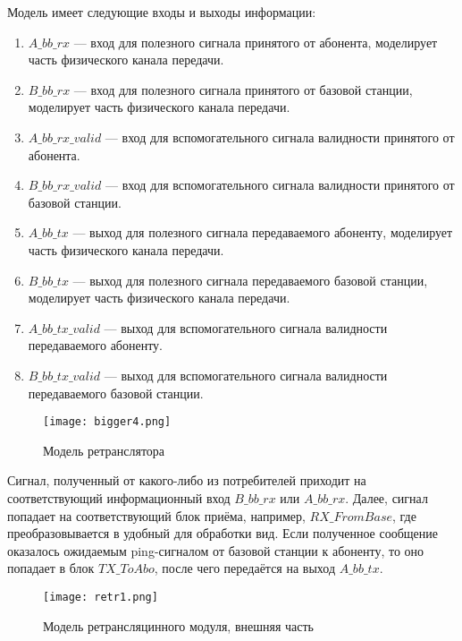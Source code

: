  Модель имеет следующие входы и выходы информации: 
    \begin{enumerate} 	
		\item $A\_bb\_rx$ — вход для полезного сигнала принятого от абонента, моделирует часть физического канала передачи.

            \item $B\_bb\_rx$ — вход для полезного сигнала принятого от базовой станции, моделирует часть физического канала передачи.
  
            \item $A\_bb\_rx\_valid$ — вход для вспомогательного сигнала валидности принятого от абонента.

            \item $B\_bb\_rx\_valid$ — вход для вспомогательного сигнала валидности принятого от базовой станции.

            \item $A\_bb\_tx$ — выход для полезного сигнала передаваемого абоненту, моделирует часть физического канала передачи.

             \item $B\_bb\_tx$ — выход для полезного сигнала передаваемого базовой станции, моделирует часть физического канала передачи.
  
            \item $A\_bb\_tx\_valid$ — выход для вспомогательного сигнала валидности передаваемого абоненту.

             \item $B\_bb\_tx\_valid$ — выход для вспомогательного сигнала валидности передаваемого базовой станции.
\end{enumerate}

\begin{figure}[h!]
	\centering
	\texttt{[image: bigger4.png]}
	\caption{Модель ретранслятора}
	\label{fig:model14}
\end{figure}

Сигнал, полученный от какого-либо из потребителей приходит на соответствующий информационный вход $B\_bb\_rx$ или $A\_bb\_rx$. Далее, сигнал попадает на соответствующий блок приёма, например, $RX\_FromBase$, где преобразовывается в удобный для обработки вид. Если полученное сообщение оказалось ожидаемым ping-сигналом от базовой станции к абоненту, то оно попадает в блок $TX\_ToAbo$, после чего передаётся на выход $A\_bb\_tx$.



\begin{figure}[h!]
		\centering
		\texttt{[image: retr1.png]}
		\caption{Модель ретрансляцинного модуля, внешняя часть}
		\label{fig:model15}
	\end{figure}



